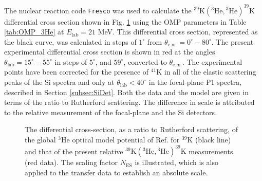 The nuclear reaction code \texttt{Fresco} \cite{Thompson1988,Fresco} was used to calculate the $^{39}\mathrm{K}(^{3}\mathrm{He}, {}^{3}\mathrm{He})^{39}\mathrm{K}$ differential cross section shown in Fig. \ref{fig:ES_NoNorm} using the OMP parameters in Table \ref{tab:OMP_3He} at $E_{\mathrm{lab}} = 21$ MeV. This differential cross section, represented as the black curve, was calculated in steps of $1^{\circ}$ from $\theta_{\mathrm{c.m.}} = 0^{\circ} - 80^{\circ}$. The present experimental differential cross section is shown in red at the angles $\theta_{\mathrm{lab}} = 15^{\circ} - 55^{\circ}$ in steps of $5^{\circ}$, and $59^{\circ}$, converted to $\theta_{\mathrm{c.m.}}$. The experimental points have been corrected for the presence of $^{41}$K in all of the elastic scattering peaks of the Si spectra and only at $\theta_{\mathrm{lab}} < 40^{\circ}$ in the focal-plane P1 spectra, described in Section \ref{subsec:SiDet}. Both the data and the model are given in terms of the ratio to Rutherford scattering. The difference in scale is attributed to the relative measurement of the focal-plane and the Si detectors.

\begin{figure}[t]
\centering
{}
\caption{\label{fig:ES_NoNorm}The differential cross-section, as a ratio to Rutherford scattering, of the global $^{3}$He optical model potential of Ref. \cite{Liang2009} for $^{39}$K (black line) and that of the present relative $^{39}\mathrm{K}(^{3}\mathrm{He}, {}^{3}\mathrm{He})^{39}\mathrm{K}$ measurements (red data). The scaling factor $N_{\mathrm{ES}}$ is illustrated, which is also applied to the transfer data to establish an absolute scale.}
\end{figure}

